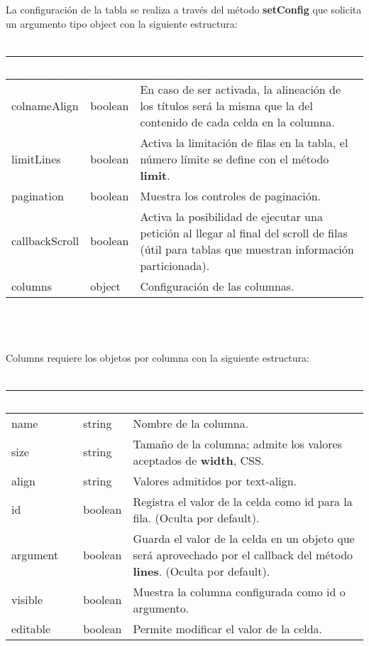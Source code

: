 \documentclass[10pt]{article}
\begin{document}
La configuración de la tabla se realiza a través del método \textbf{setConfig} que solicita un argumento tipo object con la siguiente estructura:
\\\\
\begin{tabular}{|m{2.2cm}|m{1.5cm}|m{11.5cm}|}
	\hline
	\rowcolor{black}\textcolor{white}{Parámetro} & \textcolor{white}{Tipo} & \textcolor{white}{Descripción} \\
	\hline
    colnameAlign & boolean & En caso de ser activada, la alineación de los títulos será la misma que la del contenido de cada celda en la columna. \\
    \hline
    limitLines & boolean & Activa la limitación de filas en la tabla, el número límite se define con el método \textbf{limit}. \\
    \hline
    pagination & boolean & Muestra los controles de paginación. \\
    \hline
    callbackScroll & boolean & Activa la posibilidad de ejecutar una petición al llegar al final del scroll de filas (útil para tablas que muestran información particionada). \\ 
    \hline
    columns & object & Configuración de las columnas. \\
    \hline
\end{tabular}
\\\\\\
Columns requiere los objetos por columna con la siguiente estructura:
\\\\
\begin{tabular}{|m{2.2cm}|m{1.5cm}|m{11.5cm}|}
	\hline
	\rowcolor{black}\textcolor{white}{Parámetro} & \textcolor{white}{Tipo} & \textcolor{white}{Descripción} \\
	\hline
	name & string & Nombre de la columna. \\
	\hline
	size & string & Tamaño de la columna; admite los valores aceptados de \textbf{width}, CSS. \\
	\hline
	align & string & Valores admitidos por text-align. \\
	\hline
	id & boolean & Registra el valor de la celda como id para la fila. (Oculta por default). \\
	\hline
	argument & boolean & Guarda el valor de la celda en un objeto que será aprovechado por el callback del método \textbf{lines}. (Oculta por default). \\
	\hline
	visible & boolean & Muestra la columna configurada como id o argumento. \\
	\hline
	editable & boolean & Permite modificar el valor de la celda. \\
	\hline
\end{tabular}
\end{document}
